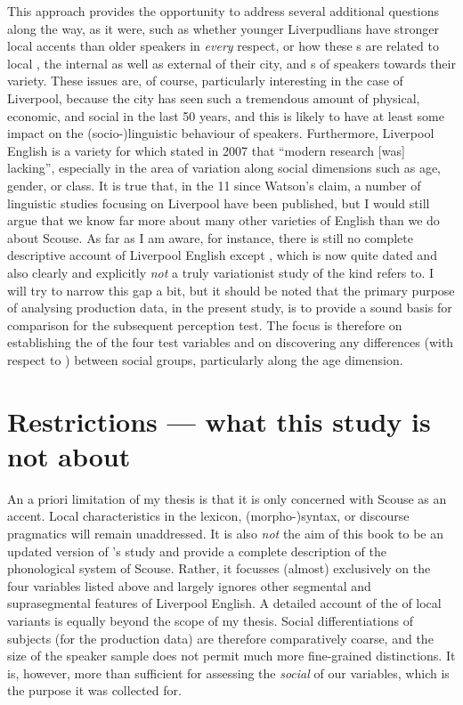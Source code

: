 This approach provides the opportunity to address several additional questions along the way, as it were, such as whether younger Liverpudlians have stronger local accents than older speakers in \emph{every} respect, or how these s are related to local , the internal as well as external  of their city, and s of speakers towards their variety.
These issues are, of course, particularly interesting in the case of Liverpool, because the city has seen such a tremendous amount of physical, economic, and social  in the last 50 years, and this is likely to have at least some impact on the (socio-)linguistic behaviour of speakers.
Furthermore, Liverpool English is a variety for which \textcite[351]{watson2007} stated in 2007 that ``modern research [was] lacking'', especially in the area of variation along social dimensions such as age, gender, or class.
It is true that, in the 11 since Watson's claim, a number of linguistic studies focusing on Liverpool have been published, but I would still argue that we know far more about many other varieties of English than we do about Scouse.
As far as I am aware, for instance, there is still no complete descriptive account of Liverpool English except \cite{knowles1973}, which is now quite dated and also clearly and explicitly \emph{not} a truly variationist study of the kind \textcite{watson2007} refers to.
I will try to narrow this gap a bit, but it should be noted that the primary purpose of analysing production data, in the present study, is to provide a sound basis for comparison for the subsequent perception test.
The focus is therefore on establishing the  of the four test variables and on discovering any differences (with respect to ) between social groups, particularly along the age dimension.

\section{Restrictions --- what this study is not about}
\label{sec.intro.restrict}

An a priori limitation of my thesis is that it is only concerned with Scouse as an accent.
Local characteristics in the lexicon, (morpho-)syntax, or discourse pragmatics will remain unaddressed.
It is also \emph{not} the aim of this book to be an updated version of \citeauthor{knowles1973}'s \citeyear{knowles1973} study and provide a complete description of the phonological system of Scouse.
Rather, it focusses (almost) exclusively on the four variables listed above and largely ignores other segmental and suprasegmental features of Liverpool English.
A detailed account of the  of local variants is equally beyond the scope of my thesis.
Social differentiations of subjects (for the production data) are therefore comparatively coarse, and the size of the speaker sample does not permit much more fine-grained distinctions.
It is, however, more than sufficient for assessing the \emph{social } of our variables, which is the purpose it was collected for.

